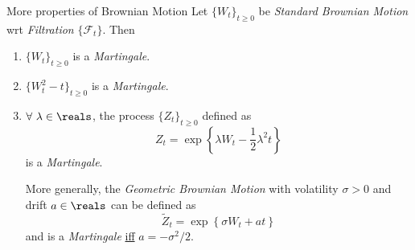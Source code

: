 \documentclass[11pt,a4paper]{article}
\begin{document}
  \begin{proposition}{More properties of Brownian Motion}\label{pro_more_properties_of_brownian_motion}
    Let $\{W_t\}_{t\geq0}$ be \textit{Standard Brownian Motion} wrt \textit{Filtration} $\{\mathcal{F}_t\}$. Then
    \begin{enumerate}
      \item $\{W_t\}_{t\geq0}$ is a \textit{Martingale}.
      \item $\{W_t^2-t\}_{t\geq0}$ is a \textit{Martingale}.
      \item $\forall\ \lambda\in\reals$, the process $\{Z_t\}_{t\geq0}$ defined as
      \[ Z_t=\exp\left\{\lambda W_t-\frac12\lambda^2t\right\} \]
      is a \textit{Martingale}.
      \par More generally, the \textit{Geometric Brownian Motion} with volatility $\sigma>0$ and drift $a\in\reals$ can be defined as
      \[ \tilde{Z}_t=\exp\left\{\sigma W_t+at\right\} \]
      and is a \textit{Martingale} \underline{iff} $a=-\sigma^2/2$.
    \end{enumerate}
  \end{proposition}
\end{document}
